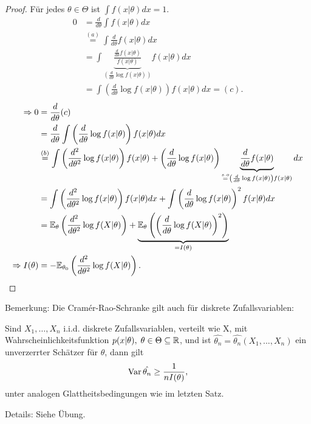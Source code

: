 \documentclass{tstextbook}
\begin{document}
\begin{proof}
	Für jedes $ \theta\in\Theta $ ist $ \int f(x|\theta)dx = 1 $. 
	\[
	\begin{aligned}
		0 & = \frac{d}{d\theta}\int f(x|\theta) dx \\ 
		& \overset{(a)}{=} \int \frac{d}{d\theta} f(x|\theta) dx \\
		& = \int \underbrace{\frac{\frac{d}{d\theta}f(x|\theta)}{f(x|\theta)}}_{  \left(\frac{d}{d\theta} \log f(x|\theta)\right) } f(x|\theta) dx \\
		& = \int \left(\frac{d}{d\theta} \log f(x|\theta)\right) f(x|\theta) dx = (c).
	\end{aligned}
	\]
	\[\begin{aligned}
	\Rightarrow 0 & = \frac{d}{d\theta} (c) \\
	& = \frac{d}{d\theta}\int \left(\frac{d}{d\theta} \log f(x|\theta)\right) f(x|\theta) dx \\
	& \overset{(b)}{=} \int \left(\frac{d^2}{d\theta^2} \log f(x|\theta)\right) f(x|\theta) + \left(\frac{d}{d\theta}\log f(x|\theta)\right) \underbrace{\frac{d}{d\theta} f(x|\theta)}_{\overset{s.o}{=}\left(\frac{d}{d\theta}\log f(x|\theta)\right)f(x|\theta)} dx \\
	& = \int \left(\frac{d^2}{d\theta^2} \log f(x|\theta)\right) f(x|\theta) dx + \int \left(\frac{d}{d\theta}\log f(x|\theta)\right)^2 f(x|\theta) dx \\
	& = \mathbb E_{\theta} \left(\frac{d^2}{d\theta^2}\log f(X|\theta)\right)+\underbrace{\mathbb E_{\theta}\left(\left(\frac{d}{d\theta}\log f(X|\theta)\right)^2\right)}_{=I(\theta)} \\
	\Rightarrow I(\theta) & = - \mathbb E_{\theta_0}\left(\frac{d^2}{d\theta^2}\log f(X|\theta)\right). 
	\end{aligned}
	\]
	
	
\end{proof}


\begin{remark}
	Bemerkung: Die Cramér-Rao-Schranke gilt auch für diskrete Zufallsvariablen: 
	
	Sind $ X_1,\ldots,X_n $ i.i.d. diskrete Zufallsvariablen, verteilt wie X,  mit Wahrscheinlichkeitsfunktion $ p(x|\theta), \; \theta \in\Theta\subseteq\mathbb R $, und ist $ \hat{\theta_n} =  \hat{\theta_n} (X_1, ... , X_n)  $ ein unverzerrter Schätzer für $ \theta $, dann gilt 
	\[
	\operatorname{Var}{ \hat{\theta_n}} \ge \frac{1}{nI(\theta)},
	\] 
        unter analogen Glattheitsbedingungen wie im letzten Satz. 
	
	Details: Siehe Übung.
\end{remark}
\end{document}
